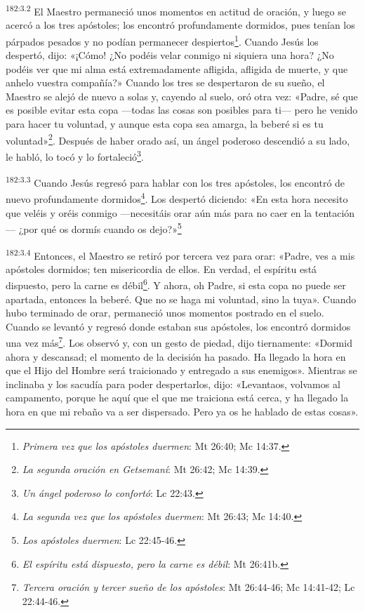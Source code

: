 \par 
\textsuperscript{182:3.2} El Maestro permaneció unos momentos en actitud de oración, y luego se acercó a los tres apóstoles; los encontró profundamente dormidos, pues tenían los párpados pesados y no podían permanecer despiertos\footnote{\textit{Primera vez que los apóstoles duermen}: Mt 26:40; Mc 14:37.}. Cuando Jesús los despertó, dijo: «¡Cómo! ¿No podéis velar conmigo ni siquiera una hora? ¿No podéis ver que mi alma está extremadamente afligida, afligida de muerte, y que anhelo vuestra compañía?» Cuando los tres se despertaron de su sueño, el Maestro se alejó de nuevo a solas y, cayendo al suelo, oró otra vez: «Padre, sé que es posible evitar esta copa ---todas las cosas son posibles para ti--- pero he venido para hacer tu voluntad, y aunque esta copa sea amarga, la beberé si es tu voluntad»\footnote{\textit{La segunda oración en Getsemaní}: Mt 26:42; Mc 14:39.}. Después de haber orado así, un ángel poderoso descendió a su lado, le habló, lo tocó y lo fortaleció\footnote{\textit{Un ángel poderoso lo confortó}: Lc 22:43.}.

\par 
\textsuperscript{182:3.3} Cuando Jesús regresó para hablar con los tres apóstoles, los encontró de nuevo profundamente dormidos\footnote{\textit{La segunda vez que los apóstoles duermen}: Mt 26:43; Mc 14:40.}. Los despertó diciendo: «En esta hora necesito que veléis y oréis conmigo ---necesitáis orar aún más para no caer en la tentación--- ¿por qué os dormís cuando os dejo?»\footnote{\textit{Los apóstoles duermen}: Lc 22:45-46.}

\par 
\textsuperscript{182:3.4} Entonces, el Maestro se retiró por tercera vez para orar: «Padre, ves a mis apóstoles dormidos; ten misericordia de ellos. En verdad, el espíritu está dispuesto, pero la carne es débil\footnote{\textit{El espíritu está dispuesto, pero la carne es débil}: Mt 26:41b.}. Y ahora, oh Padre, si esta copa no puede ser apartada, entonces la beberé. Que no se haga mi voluntad, sino la tuya». Cuando hubo terminado de orar, permaneció unos momentos postrado en el suelo. Cuando se levantó y regresó donde estaban sus apóstoles, los encontró dormidos una vez más\footnote{\textit{Tercera oración y tercer sueño de los apóstoles}: Mt 26:44-46; Mc 14:41-42; Lc 22:44-46.}. Los observó y, con un gesto de piedad, dijo tiernamente: «Dormid ahora y descansad; el momento de la decisión ha pasado. Ha llegado la hora en que el Hijo del Hombre será traicionado y entregado a sus enemigos». Mientras se inclinaba y los sacudía para poder despertarlos, dijo: «Levantaos, volvamos al campamento, porque he aquí que el que me traiciona está cerca, y ha llegado la hora en que mi rebaño va a ser dispersado. Pero ya os he hablado de estas cosas».

